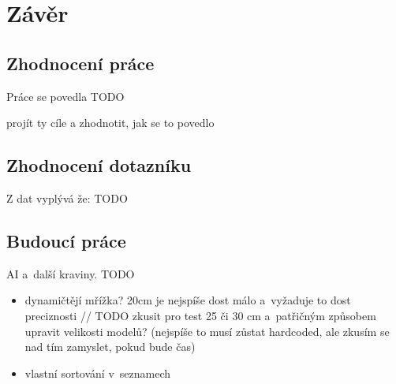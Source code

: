 
\chapter{Závěr}


\section{Zhodnocení práce}

Práce se povedla TODO

projít ty cíle a zhodnotit, jak se to povedlo

\section{Zhodnocení dotazníku}

Z dat vyplývá že: TODO

\section{Budoucí práce}

AI a~další kraviny. TODO

\begin{itemize}
	\item dynamičtějí mřížka? 20cm je nejspíše dost málo a~vyžaduje to dost preciznosti // TODO zkusit pro test 25 či 30 cm a~patřičným způsobem upravit velikosti modelů? (nejspíše to musí zůstat hardcoded, ale zkusím se nad tím zamyslet, pokud bude čas)
	\item vlastní sortování v~seznamech

\end{itemize}

